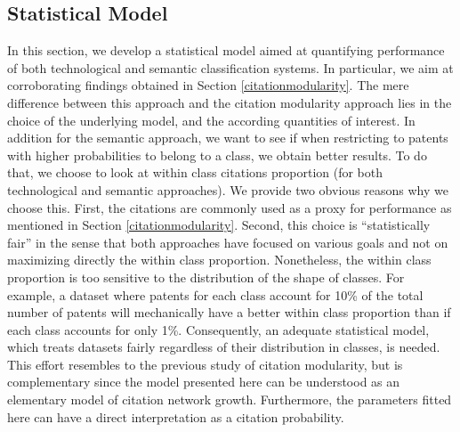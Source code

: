 \documentclass[article]{article}%
\begin{document}
\subsection{Statistical Model}
\label{statisticalmodel}
In this section, we develop a statistical model aimed at quantifying performance of both technological and semantic classification systems. In particular, we aim at corroborating findings obtained in Section \ref{citationmodularity}. The mere difference between this approach and the citation modularity approach lies in the choice of the underlying model, and the according quantities of interest. In addition for the semantic approach, we want to see if when restricting to patents with higher probabilities to belong to a class, we obtain better results. To do that, we choose to look at within class citations proportion (for both technological and semantic approaches). We provide two obvious reasons why we choose this. First, the citations are commonly used as a proxy for performance as mentioned in Section \ref{citationmodularity}. Second, this choice is ``statistically fair'' in the sense that both approaches have focused on various goals and not on maximizing directly the within class proportion. 
Nonetheless, the within class proportion is too sensitive to the distribution of the shape of classes. For example, a dataset where patents for each class account for 10\% of the total number of patents will mechanically have a better within class proportion than if each class accounts for only 1\%. Consequently, an adequate statistical model, which treats datasets fairly regardless of their distribution in classes, is needed. This effort resembles to the previous study of citation modularity, but is complementary since the model presented here can be understood as an elementary model of citation network growth. Furthermore, the parameters fitted here can have a direct interpretation as a citation probability.
\end{document}
